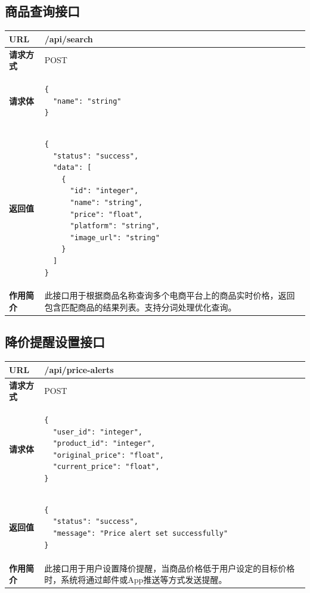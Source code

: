 \documentclass[12pt]{article}
\begin{document}
\subsection{商品查询接口}
\begin{longtable}{|p{3cm}|p{10cm}|}
\hline
\textbf{URL} & /api/search \\ \hline
\textbf{请求方式} & POST \\ \hline
\textbf{请求体} &
\begin{verbatim}
{
  "name": "string"
}
\end{verbatim} \\ \hline
\textbf{返回值} &
\begin{verbatim}
{
  "status": "success",
  "data": [
    {
      "id": "integer",
      "name": "string",
      "price": "float",
      "platform": "string",
      "image_url": "string"
    }
  ]
}
\end{verbatim} \\ \hline
\textbf{作用简介} & 此接口用于根据商品名称查询多个电商平台上的商品实时价格，返回包含匹配商品的结果列表。支持分词处理优化查询。 \\ \hline
\end{longtable}

\subsection{降价提醒设置接口}
\begin{longtable}{|p{3cm}|p{10cm}|}
\hline
\textbf{URL} & /api/price-alerts \\ \hline
\textbf{请求方式} & POST \\ \hline
\textbf{请求体} &
\begin{verbatim}
{
  "user_id": "integer",
  "product_id": "integer",
  "original_price": "float",
  "current_price": "float",
}
\end{verbatim} \\ \hline
\textbf{返回值} &
\begin{verbatim}
{
  "status": "success",
  "message": "Price alert set successfully"
}
\end{verbatim} \\ \hline
\textbf{作用简介} & 此接口用于用户设置降价提醒，当商品价格低于用户设定的目标价格时，系统将通过邮件或App推送等方式发送提醒。 \\ \hline
\end{longtable}

\end{document}
